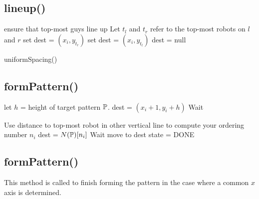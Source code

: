 \documentclass[preprint,10pt]{elsarticle}
\begin{document}

\subsection{lineup()} 
	\begin{algorithm}[H]
	\begin{algorithmic}[1]
		
		\Comment ensure that top-most guys line up
		\State Let $t_l$ and $t_r$ refer to the top-most robots on $l$ and $r$
			\State set dest = $(x_i, y_{t_r})$
			\State set dest = $(x_i, y_{t_l})$
		\Else 
			\State dest = null
		\EndIf

		\State uniformSpacing()
	\EndProcedure
	\end{algorithmic}
	\end{algorithm}

\subsection{formPattern()} 
	\begin{algorithm}[H]
	\begin{algorithmic}[1]

			\State let $h$ = height of target pattern $\mathbb{P}$.
			\State dest = $(x_i + 1, y_i + h)$
		\EndIf
			Wait
		\EndWhile

		\State Use distance to top-most robot in other vertical line to compute your 
		ordering number $n_i$
		\State dest = $N(\mathbb{P})[n_i]$
			Wait
		\EndWhile
		\State move to dest
		state = DONE

	\EndProcedure
	\end{algorithmic}
	\end{algorithm}
\subsection{formPattern()} 
This method is called to finish forming the pattern in the case where
a common $x$ axis is determined.
\begin{algorithm}[H]
\begin{algorithmic}[1]
			
		\EndCase
	\EndSwitch
\EndProcedure
\end{algorithmic}
\end{algorithm}
\end{document}
